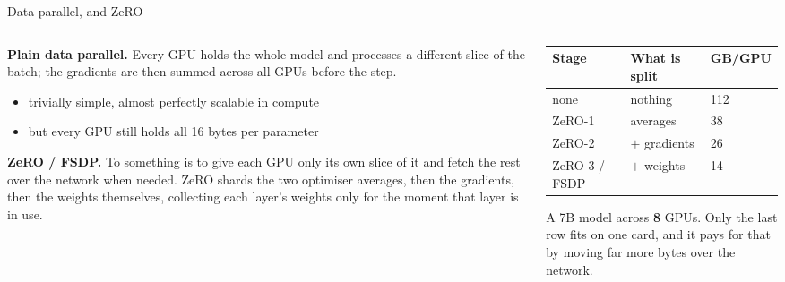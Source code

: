 \documentclass[aspectratio=169,10pt]{beamer}
\begin{document}
\begin{frame}[shrink=12]{Data parallel, and ZeRO}
  \begin{columns}[T]
    \begin{column}{0.52\textwidth}
      \textbf{Plain data parallel.} Every GPU holds the whole model and
      processes a different slice of the batch; the gradients are then summed
      across all GPUs before the step.
      \begin{itemize}\small
        \item trivially simple, almost perfectly scalable in compute
        \item \alert{but every GPU still holds all 16 bytes per parameter}
      \end{itemize}
      \vspace{0.5em}

      \textbf{ZeRO / FSDP.} To  something is to give each GPU only
      its own slice of it and fetch the rest over the network when needed. ZeRO
      shards the two optimiser averages, then the gradients, then the weights
      themselves, collecting each layer's weights only for the moment that
      layer is in use.
    \end{column}
    \begin{column}{0.48\textwidth}
      \centering
      \begin{tabular}{@{}L{2.3cm} L{2.1cm} C{1.35cm}@{}}
        \toprule
        \textbf{Stage} & \textbf{What is split} & \textbf{GB/GPU}\\
        \midrule
        none & nothing & 112\\
        ZeRO-1 & averages & 38\\
        ZeRO-2 & $+$ gradients & 26\\
        ZeRO-3 / FSDP & $+$ weights & 14\\
        \bottomrule
      \end{tabular}

      \vspace{0.6em}
      \raggedright\small
      A 7B model across \textbf{8} GPUs. Only the last row fits on one card,
      and it pays for that by moving far more bytes over the network.
    \end{column}
  \end{columns}
\end{frame}
\end{document}
